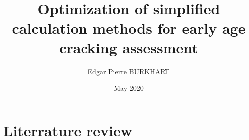 \documentclass{report}
\title{Optimization of simplified calculation methods for early age cracking assessment}
\author{Edgar Pierre BURKHART}
\date{May 2020}
\begin{document}
\maketitle

\tableofcontents

\chapter{Literrature review}
\end{document}
